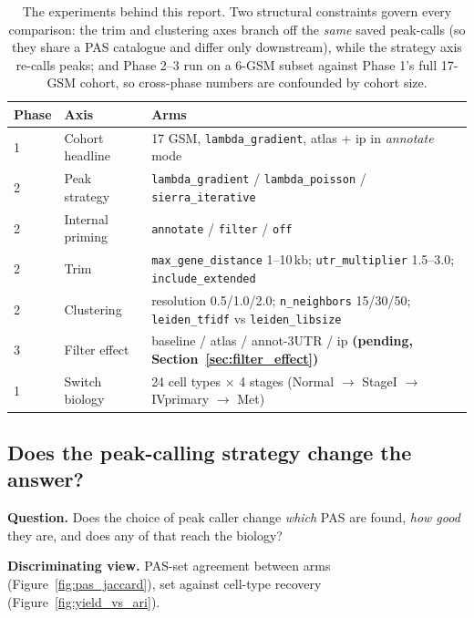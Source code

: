 \documentclass[11pt,a4paper]{article}
\begin{document}
\begin{table}[htbp]
  \centering
  \small
  \begin{tabularx}{\textwidth}{llX}
    \toprule
    \textbf{Phase} & \textbf{Axis} & \textbf{Arms} \\
    \midrule
    1 & Cohort headline & 17 GSM, \texttt{lambda\_gradient}, atlas + ip in \emph{annotate} mode \\
    2 & Peak strategy & \texttt{lambda\_gradient} / \texttt{lambda\_poisson} / \texttt{sierra\_iterative} \\
    2 & Internal priming & \texttt{annotate} / \texttt{filter} / \texttt{off} \\
    2 & Trim & \texttt{max\_gene\_distance} 1--10\,kb; \texttt{utr\_multiplier} 1.5--3.0; \texttt{include\_extended} \\
    2 & Clustering & resolution 0.5/1.0/2.0; \texttt{n\_neighbors} 15/30/50; \texttt{leiden\_tfidf} vs \texttt{leiden\_libsize} \\
    3 & Filter effect & baseline / atlas / annot-3\textquotesingle{}UTR / ip \hfill \textbf{(pending, Section~\ref{sec:filter_effect})} \\
    1 & Switch biology & 24 cell types $\times$ 4 stages (Normal $\rightarrow$ StageI $\rightarrow$ IVprimary $\rightarrow$ Met) \\
    \bottomrule
  \end{tabularx}
  \caption{The experiments behind this report. Two structural constraints govern
    every comparison: the trim and clustering axes branch off the \emph{same}
    saved peak-calls (so they share a PAS catalogue and differ only downstream),
    while the strategy axis re-calls peaks; and Phase 2--3 run on a 6-GSM subset
    against Phase 1's full 17-GSM cohort, so cross-phase numbers are confounded
    by cohort size.}
  \label{tab:experiment_axes}
\end{table}

\subsection{Does the peak-calling strategy change the answer?}
\label{sec:q_strategy}

\textbf{Question.} Does the choice of peak caller change \emph{which} PAS are
found, \emph{how good} they are, and does any of that reach the biology?

\textbf{Discriminating view.} PAS-set agreement between arms
(Figure~\ref{fig:pas_jaccard}), set against cell-type recovery
(Figure~\ref{fig:yield_vs_ari}).
\end{document}
